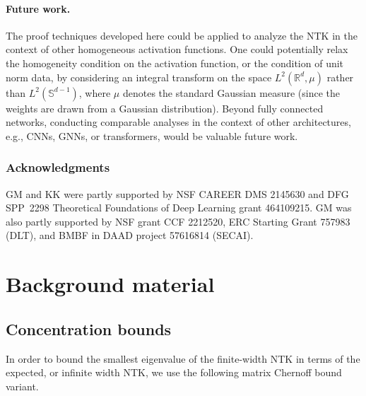 \documentclass{article}
\theoremstyle{definition}
\newcommand*{\R}{\mathbb{R}}
\renewcommand{\S}{\mathbb{S}}
\begin{document}
\paragraph{Future work.}  
The proof techniques developed here could be applied to analyze the NTK in the context of other homogeneous activation functions. 
One could potentially relax the homogeneity condition on the activation function, or the condition of unit norm data, by considering an integral transform on the space $L^2(\R^d, \mu)$ rather than $L^2(\S^{d - 1})$, where $\mu$ denotes the standard Gaussian measure (since the weights are drawn from a Gaussian distribution). 
Beyond fully connected networks, conducting comparable analyses in the context of other architectures, e.g., CNNs, GNNs, or transformers, would be valuable future work.

\subsubsection*{Acknowledgments}
GM and KK were partly supported by 
NSF CAREER DMS 2145630 and DFG SPP~2298 Theoretical Foundations of Deep Learning grant 464109215. GM was also partly supported by NSF grant CCF 2212520, ERC Starting Grant 757983 (DLT), and BMBF in DAAD project 57616814 (SECAI).


 



\newpage 




\newpage 

\appendix


\section{Background material}

\subsection{Concentration bounds}
In order to bound the smallest eigenvalue of the finite-width NTK in terms of the expected, or infinite width NTK, we use the following matrix Chernoff bound variant. 
\end{document}
